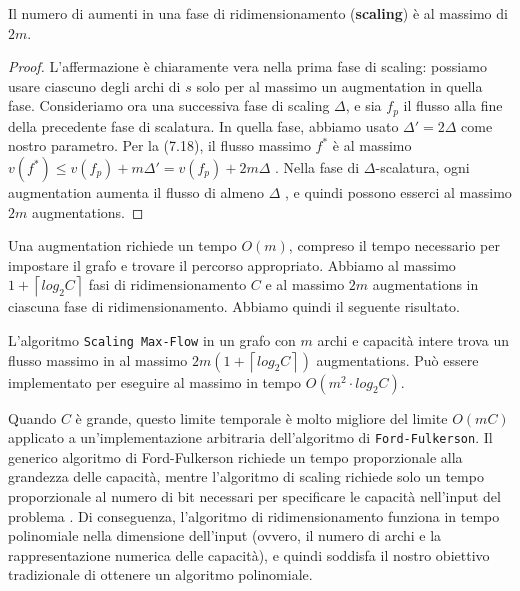 \begin{myblockquote}
  \begin{minipage}{\textwidth}
    \begin{definition}\label{def:7.19}
      Il numero di aumenti in una fase di ridimensionamento (\textbf{scaling})
      è al massimo di $2m$.
    \end{definition}
  \end{minipage}
\end{myblockquote}

\begin{proof}
  L'affermazione è chiaramente vera nella prima fase di scaling: possiamo
  usare ciascuno degli archi di $s$ solo per al massimo un augmentation
  in quella fase. Consideriamo ora una successiva fase di scaling
  $\Delta$, e sia $f_p$ il flusso alla fine della precedente fase di
  scalatura. In quella fase, abbiamo usato $\Delta' = 2\Delta$ come
  nostro parametro. Per la (7.18), il flusso massimo $f^*$ è al massimo
  $v(f^*) \le v(f_p) + m\Delta' = v(f_p) + 2m\Delta$ . Nella fase di
  $\Delta$-scalatura, ogni augmentation aumenta il flusso di almeno
  $\Delta$ , e quindi possono esserci al massimo $2m$ augmentations.
\end{proof}

Una augmentation richiede un tempo $O(m)$, compreso il tempo
necessario per impostare il grafo e trovare il percorso appropriato.
Abbiamo al massimo $1 + \left\lceil log_2 C \right\rceil$ fasi di
ridimensionamento $C$ e al massimo $2m$ augmentations in ciascuna
fase di ridimensionamento. Abbiamo quindi il seguente risultato.

\begin{myblockquote}
  \begin{minipage}{\textwidth}
    \begin{theorem}\label{th:7.20}
      L'algoritmo \texttt{Scaling\ Max-Flow} in un grafo con $m$ archi e
      capacità intere trova un flusso massimo in al massimo
      $2m(1 + \left\lceil log_2 C \right\rceil)$ augmentations. Può essere
      implementato per eseguire al massimo in tempo $O(m^2 \cdot log_2 C)$.
    \end{theorem}
  \end{minipage}
\end{myblockquote}

Quando $C$ è grande, questo limite temporale è molto migliore del
limite $O(mC)$ applicato a un'implementazione arbitraria
dell'algoritmo di \texttt{Ford-Fulkerson}. Il generico algoritmo di
Ford-Fulkerson richiede un tempo proporzionale alla grandezza delle
capacità, mentre l'algoritmo di scaling richiede solo un tempo
proporzionale al numero di bit necessari per specificare le capacità
nell'input del problema . Di conseguenza, l'algoritmo di
ridimensionamento funziona in tempo polinomiale nella dimensione
dell'input (ovvero, il numero di archi e la rappresentazione numerica
delle capacità), e quindi soddisfa il nostro obiettivo tradizionale di
ottenere un algoritmo polinomiale.
